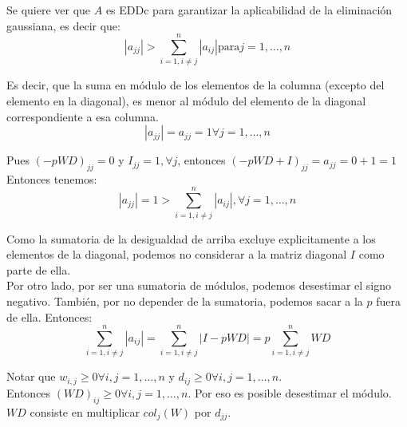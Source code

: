 		Se quiere ver que $A$ es EDDc para garantizar la aplicabilidad de la eliminación gaussiana, es decir que: \\

		\begin{equation}
			|a_{jj}| > \sum^{n}_{i=1, i \neq j} |a_{ij}| \text{para} j = 1, \hdots, n
		\end{equation}

		Es decir, que la suma en módulo de los elementos de la columna (excepto del elemento en la diagonal), es menor al módulo del elemento de la diagonal correspondiente a esa columna. \\

		\begin{equation}
			|a_{jj}| = a_{jj} = 1 \forall j = 1, \hdots, n
		\end{equation}

		Pues $(-pWD)_{jj} = 0$ y $I_{jj} = 1, \forall j$, entonces $(-pWD + I)_{jj} = a_{jj} = 0 + 1 = 1$ \\

		Entonces tenemos: \\

		\begin{equation}
			|a_{jj}| = 1 > \sum_{i=1, i \neq j}^{n} |a_{ij}|, \forall j = 1, \hdots, n
		\end{equation}

		Como la sumatoria de la desigualdad de arriba excluye explicitamente a los elementos de la diagonal, podemos no considerar a la matriz diagonal $I$ como parte de ella. \\

		Por otro lado, por ser una sumatoria de módulos, podemos desestimar el signo negativo. También, por no depender de la sumatoria, podemos sacar a la $p$ fuera de ella. Entonces: \\

		\begin{equation}
			\sum_{i=1, i \neq j}^{n} |a_{ij}| = \sum_{i=1, i \neq j}^{n} |I-pWD| = p \sum_{i=1, i \neq j}^{n} WD
		\end{equation}

		Notar que $w_{i,j} \geq 0 \forall i,j = 1, \hdots, n$ y $d_{ij} \geq 0 \forall i,j = 1, \hdots, n$. \\

		Entonces $(WD)_{ij} \geq 0 \forall i,j = 1, \hdots, n$. Por eso es posible desestimar el módulo. \\

		$WD$ consiste en multiplicar $col_{j}(W)$ por $d_{jj}$. \\

